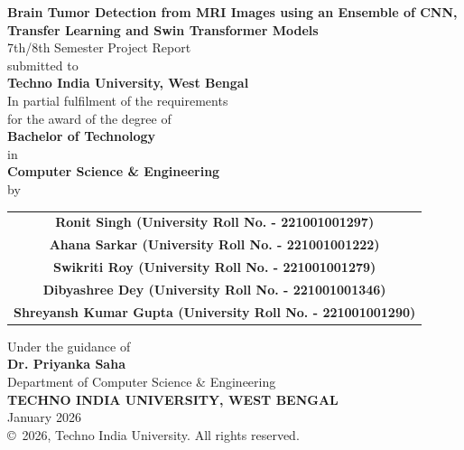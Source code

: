 \documentclass[12pt,a4paper,oneside]{report}
\begin{document}

\begin{titlepage}
\centering

\vspace*{1cm}

{\Huge \textbf{Brain Tumor Detection from MRI Images using an Ensemble of CNN, Transfer Learning and Swin Transformer Models}}\\[1cm]

{\Large 7th/8th Semester Project Report}\\[1cm]

submitted to\\[0.3cm]

{\Large \textbf{Techno India University, West Bengal}}\\[1cm]

In partial fulfilment of the requirements\\
for the award of the degree of\\[0.3cm]

{\Large \textbf{Bachelor of Technology}}\\[0.3cm]

in\\[0.3cm]

{\Large \textbf{Computer Science \& Engineering}}\\[1cm]

by\\[0.5cm]

\begin{tabular}{c}
\textbf{Ronit Singh (University Roll No. - 221001001297)} \\[0.3cm]
\textbf{Ahana Sarkar (University Roll No. - 221001001222)} \\[0.3cm]
\textbf{Swikriti Roy (University Roll No. - 221001001279)} \\[0.3cm]
\textbf{Dibyashree Dey (University Roll No. - 221001001346)} \\[0.3cm]
\textbf{Shreyansh Kumar Gupta (University Roll No. - 221001001290)}
\end{tabular}

\vspace{1.5cm}

Under the guidance of\\[0.3cm]

{\Large \textbf{Dr. Priyanka Saha}}\\[1.5cm]

Department of Computer Science \& Engineering\\
\textbf{TECHNO INDIA UNIVERSITY, WEST BENGAL}\\[1cm]

January 2026\\[0.5cm]

\copyright\ 2026, Techno India University. All rights reserved.

\end{titlepage}
\end{document}
